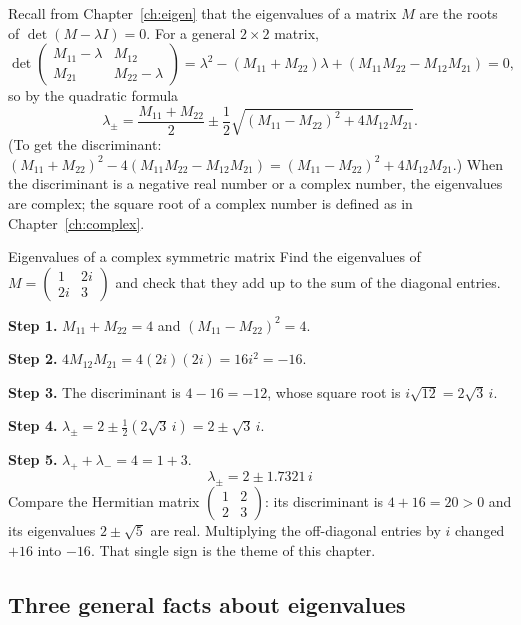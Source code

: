 Recall from Chapter~\ref{ch:eigen} that the eigenvalues of a matrix $M$ are the roots of $\det(M-\lambda I)=0$. For a general $2\times2$ matrix,
\begin{equation}
\det\begin{pmatrix} M_{11}-\lambda & M_{12}\\ M_{21} & M_{22}-\lambda\end{pmatrix}
= \lambda^2 - (M_{11}+M_{22})\lambda + (M_{11}M_{22}-M_{12}M_{21}) = 0,
\end{equation}
so by the quadratic formula
\begin{equation}
\lambda_\pm = \frac{M_{11}+M_{22}}{2} \pm \frac12\sqrt{(M_{11}-M_{22})^2 + 4M_{12}M_{21}} .
\label{eq:non-hermitian-2x2}
\end{equation}
(To get the discriminant: $(M_{11}+M_{22})^2 - 4(M_{11}M_{22}-M_{12}M_{21}) = (M_{11}-M_{22})^2+4M_{12}M_{21}$.) When the discriminant is a negative real number or a complex number, the eigenvalues are complex; the square root of a complex number is defined as in Chapter~\ref{ch:complex}.

\begin{sample}{Eigenvalues of a complex symmetric matrix}
Find the eigenvalues of $M=\begin{pmatrix}1 & 2i\\ 2i & 3\end{pmatrix}$ and check that they add up to the sum of the diagonal entries.

\textbf{Step 1.} $M_{11}+M_{22}=4$ and $(M_{11}-M_{22})^2 = 4$.

\textbf{Step 2.} $4M_{12}M_{21}=4(2i)(2i)=16i^2=-16$.

\textbf{Step 3.} The discriminant is $4-16=-12$, whose square root is $i\sqrt{12}=2\sqrt3\,i$.

\textbf{Step 4.} $\lambda_\pm = 2 \pm \tfrac12(2\sqrt3\, i) = 2\pm\sqrt3\,i$.

\textbf{Step 5.} $\lambda_++\lambda_-=4=1+3$.
\[
\boxed{\lambda_\pm = 2 \pm 1.7321\,i}
\]
Compare the Hermitian matrix $\begin{pmatrix}1&2\\2&3\end{pmatrix}$: its discriminant is $4+16=20>0$ and its eigenvalues $2\pm\sqrt5$ are real. Multiplying the off-diagonal entries by $i$ changed $+16$ into $-16$. That single sign is the theme of this chapter.
\end{sample}

\subsection{Three general facts about eigenvalues}

